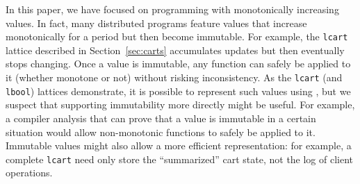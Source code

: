 In this paper, we have focused on programming with monotonically increasing
values. In fact, many distributed programs feature values that increase
monotonically for a period but then become immutable. For example, the
\texttt{lcart} lattice described in Section~\ref{sec:carts} accumulates updates
but then eventually stops changing. Once a value is immutable, any function can
safely be applied to it (whether monotone or not) without risking
inconsistency. As the \texttt{lcart} (and \texttt{lbool}) lattices demonstrate,
it is possible to represent such values using \lang, but we suspect that
supporting immutability more directly might be useful. For example, a compiler
analysis that can prove that a value is immutable in a certain situation would
allow non-monotonic functions to safely be applied to it. Immutable values might
also allow a more efficient representation: for example, a complete
\texttt{lcart} need only store the ``summarized'' cart state, not the log of
client operations.




